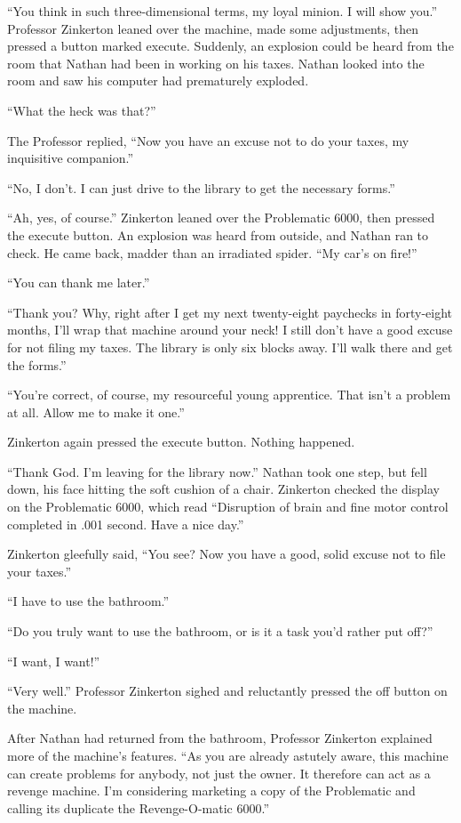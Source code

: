 “You think in such three-dimensional terms, my loyal minion. I will show you.” Professor Zinkerton leaned over the machine, made some adjustments, then pressed a button marked execute. Suddenly, an explosion could be heard from the room that Nathan had been in working on his taxes. Nathan looked into the room and saw his computer had prematurely exploded.

“What the heck was that?”

The Professor replied, “Now you have an excuse not to do your taxes, my inquisitive companion.”

“No, I don't. I can just drive to the library to get the necessary forms.”

“Ah, yes, of course.” Zinkerton leaned over the Problematic 6000, then pressed the execute button. An explosion was heard from outside, and Nathan ran to check. He came back, madder than an irradiated spider. “My car's on fire!”

“You can thank me later.”

“Thank you? Why, right after I get my next twenty-eight paychecks in forty-eight months, I'll wrap that machine around your neck! I still don't have a good excuse for not filing my taxes. The library is only six blocks away. I'll walk there and get the forms.”

“You're correct, of course, my resourceful young apprentice. That isn't a problem at all. Allow me to make it one.”

Zinkerton again pressed the execute button. Nothing happened.

“Thank God. I'm leaving for the library now.” Nathan took one step, but fell down, his face hitting the soft cushion of a chair. Zinkerton checked the display on the Problematic 6000, which read “Disruption of brain and fine motor control completed in .001 second. Have a nice day.”

Zinkerton gleefully said, “You see? Now you have a good, solid excuse not to file your taxes.”

“I have to use the bathroom.”

“Do you truly want to use the bathroom, or is it a task you'd rather put off?”

“I want, I want!”

“Very well.” Professor Zinkerton sighed and reluctantly pressed the off button on the machine.

After Nathan had returned from the bathroom, Professor Zinkerton explained more of the machine's features. “As you are already astutely aware, this machine can create problems for anybody, not just the owner. It therefore can act as a revenge machine. I'm considering marketing a copy of the Problematic and calling its duplicate the Revenge-O-matic 6000.”

